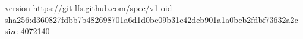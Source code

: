 version https://git-lfs.github.com/spec/v1
oid sha256:d360827fdbb7b482698701a6d1d0be09b31c42deb901a1a0bcb2fdbf73632a2c
size 4072140
